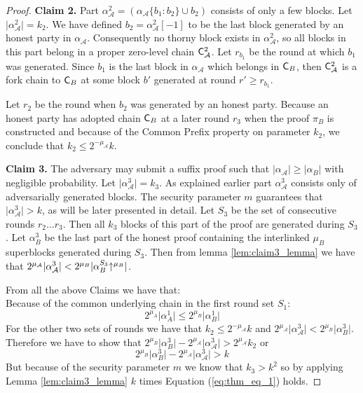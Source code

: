 \begin{proof}
\textbf{Claim 2.}
Part $\alpha_\mathcal{A}^2 = (\alpha_\mathcal{A}\{b_1:b_2\} \cup b_2)$ consists of only a few blocks. Let $ \lvert \alpha_\mathcal{A}^2 \rvert = k_2$. We have defined $b_2 = \alpha_\mathcal{A}^2[-1]$ to be the last block generated by an honest party in $\alpha_\mathcal{A}$. Consequently no thorny block exists in $\alpha_\mathcal{A}^2$, so all blocks in this part belong in a proper zero-level chain $\mathsf{C}_\mathcal{A}^2$.  Let $r_{b_1}$ be the round at which $b_1$ was generated. Since $b_1$ is the last block in $\alpha_\mathcal{A}$ which belongs in $\mathsf{C}_B$, then $\mathsf{C}_\mathcal{A}^2$ is a fork chain to $\mathsf{C}_B$ at some block $b'$ generated at round $r' \geq r_{b_1}$.

Let $r_2$ be the round when $b_2$ was generated by an honest party. Because an honest party has adopted chain $\mathsf{C}_B$ at a later round $r_3$ when the proof $\pi_B$ is constructed and because of the Common Prefix property on parameter $k_2$, we conclude that $k_2 \leq 2^{-\mu_\mathcal{A}}k$.

\textbf{Claim 3.} The adversary may submit a suffix proof such that $\lvert \alpha_\mathcal{A}\rvert \geq \lvert \alpha_B \rvert$ with negligible probability. Let $ \lvert \alpha_\mathcal{A}^3 \rvert = k_3$. As explained earlier part $\alpha^3_\mathcal{A}$ consists only of adversarially generated blocks. The security parameter $m$ guarantees that $\lvert \alpha^3_\mathcal{A} \rvert > k$, as will be later presented in detail. Let $S_3$ be the set of consecutive rounds $r_2...r_3$. Then all $k_3$ blocks of this part of the proof are generated during $S_3$. Let $\alpha^{3}_B$ be the last part of the honest proof containing the interlinked $\mu_B$ superblocks generated during $S_3$. Then from lemma \ref{lem:claim3_lemma} we have that $ 2^{\mu_\mathcal{A}}\lvert \alpha^3_\mathcal{A} \rvert < 2^{\mu_B} \lvert \alpha^{S_3}_{B}\negthickspace\uparrow^{\mu_B} \rvert $.

From all the above Claims we have that:\\
Because of the common underlying chain in the first round set $S_1$:
\begin{equation} \label{eq_round_set_1}
    2^{\mu_A} \vert \alpha_A^{1} \vert \leq 2^{\mu_B} \vert \alpha{_B^{1}} \vert
\end{equation}
For the other two sets of rounds we have that $ k_2 \leq 2^{-\mu_\mathcal{A}}k$ and $2^{\mu_\mathcal{A}} \lvert \alpha_\mathcal{A}^{3} \rvert < 2^{\mu_B} \lvert \alpha{_B^{3}} \rvert$. Therefore we have to show that  $ 2^{\mu_B} \lvert \alpha{_B^{3}} \rvert - 2^{\mu_\mathcal{A}} \lvert \alpha_\mathcal{A}^{3} \rvert > 2^{\mu_\mathcal{A}}k_2 $ or \begin{equation}\label{eq:thm_eq_1}
    2^{\mu_B} \lvert \alpha{_B^{3}} \rvert - 2^{\mu_\mathcal{A}} \lvert \alpha_\mathcal{A}^{3} \rvert > k
\end{equation} But because of the security parameter $m$ we know that $k_3 > k^2$ so by applying Lemma \ref{lem:claim3_lemma} $k$ times Equation (\ref{eq:thm_eq_1}) holds.


\end{proof}
